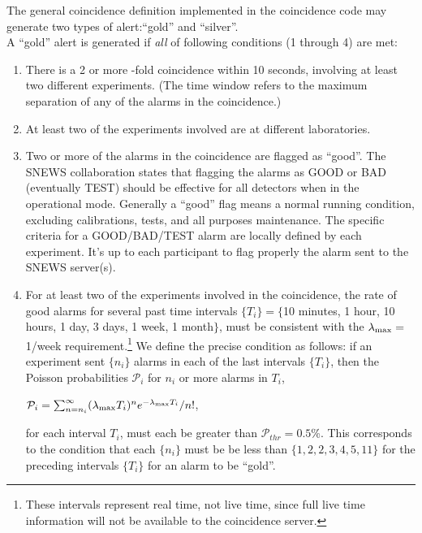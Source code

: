 \documentclass{article}
\begin{document}
The general coincidence definition implemented in the coincidence code
may generate two types of alert:``gold'' and ``silver''.\\
A ``gold'' alert is generated if {\it all} of
following conditions (1 through 4) are met:

\begin{enumerate}

\item There is a 2 or more -fold coincidence within 10 seconds,
involving at least two different experiments. 
(The time window refers to the maximum
separation of any of the alarms in the coincidence.)

\item At least two of the experiments involved
are at different laboratories.

\item Two or more of the alarms in the coincidence
are flagged as ``good''.  The SNEWS collaboration states
that flagging the alarms as GOOD or BAD (eventually TEST) should be effective 
for all detectors when in the operational  mode. 
Generally a ``good'' flag means a normal running condition, excluding 
calibrations, tests, and all purposes maintenance.  
The specific criteria for a GOOD/BAD/TEST alarm are locally defined by
each experiment. 
It's up to each participant to flag properly the alarm sent to the SNEWS 
server(s).  
 
\item For at least two of the experiments involved in the coincidence,
the rate of good alarms for several past time intervals $\{T_i\}=\{$10 minutes, 1
hour, 10 hours, 1 day, 3 days, 1 week, 1 month$\}$, must be consistent with
the $\lambda_{\rm{max}}=$1/week requirement.\footnote{These intervals
represent real time, not live time, since full live time information
will not be available to the coincidence server.}
We define the precise condition 
as follows:  
if an experiment sent $\{n_i\}$ alarms in 
each of the last intervals $\{T_i\}$,
then the Poisson probabilities $\mathcal{P}_i$ for $n_i$ or more
alarms in $T_i$,

$\mathcal{P}_i=\sum_{n=n_i}^{\infty}(\lambda_{\rm{max}} T_i)^{n}e^{-\lambda_{\rm{max}} T_i}/n!$,

for each interval $T_i$, must each be greater than $\mathcal{P}_{thr}=0.5$\%.
This corresponds to the condition that each $\{n_i\}$ must be be less
than $\{1,2,2,3,4,5,11\}$ for the preceding intervals $\{T_i\}$ for an
alarm to be ``gold''.

\end{enumerate}
\end{document}
